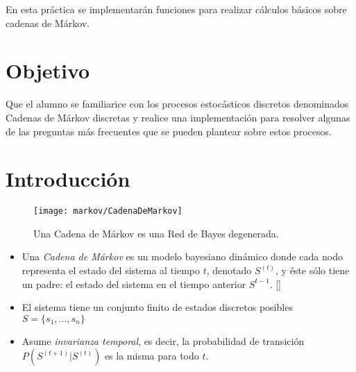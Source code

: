 
En esta práctica se implementarán funciones para realizar cálculos básicos sobre cadenas de Márkov.

\section{Objetivo}

\begin{compactitem}
 \item Que el alumno se familiarice con los procesos estocásticos discretos denominados Cadenas de Márkov discretas y realice una implementación para resolver algunas de las preguntas más frecuentes que se pueden plantear sobre estos procesos. \parencite{gestiondeoperaciones2015}
\end{compactitem}


\section{Introducción}

\begin{figure}
 \centering
 \texttt{[image: markov/CadenaDeMarkov]}
 \caption{Una Cadena de Márkov es una Red de Bayes degenerada.}\label{Fig:CadenaDeMarkov}
\end{figure}

\begin{definition}
 \begin{itemize}
  \item Una \emph{Cadena de Márkov} es un modelo bayesiano dinámico donde cada nodo representa el estado del sistema al tiempo $t$, denotado $S^{(t)}$, y éste sólo tiene un padre: el estado del sistema en el tiempo anterior $S^{t-1}$. []

  \item El sistema tiene un conjunto finito de estados discretos posibles $S = \{s_1,...,s_n\}$

  \item Asume \emph{invarianza temporal}, es decir, la probabilidad de transición $P(S^{(t+1)}|S^{(t)})$ es la misma para todo $t$.
 \end{itemize}
\end{definition}

